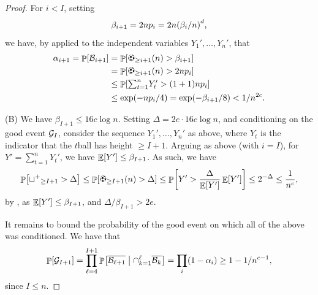 \begin{proof}
    For
    $i < I$, setting
    \begin{equation*}
        \beta_{i+1} = 2np_i  = 2 n \pth{\beta_i/n}^d,        
    \end{equation*}
    we have, by 
    applied to the independent variables $Y_1', \ldots, Y_n'$, that
    \begin{align*}
      \alpha_{i+1}%
      =%
      \Prob{\BadEvent_{i+1}}%
      &=%
      \Prob{\ballsY{i+1}{n} > \beta_{i+1}}%
      \\&
      =%
      \Prob{\ballsY{i+1}{n} > 2np_i}
      \\&
      \leq 
      \Prob{ \textstyle{\sum_{t=1}^n} Y_t' > (1+1)n p_i}%
      \\&
      \leq%
      \exp( -n p_i/4 )
      =
      \exp(-\beta_{i+1}/8) < 1/n^{2c}.
    \end{align*}

    (B) We have $\beta_{I+1} \leq 16 c \log n$.  Setting
    $\Delta = 2e \cdot 16 c \log n$, and conditioning on the good event
    $\mathcal{G}_I$,%
    consider the sequence $Y_1', \ldots, Y_n'$ as above, where $Y_t$ is the
    indicator that the $t$\th ball has height $\geq I+1$. Arguing as above
    (with $i = I$), for $Y' = \sum_{t=1}^n Y_t'$, we have
    $\mathop{\mathbb{E}}\!\left[ {Y'} \right] \leq \beta_{I+1}$. As such, we have
    \begin{equation*}
        \Prob{\BLX{I+1} > \Delta}
        \leq%
        \Prob{\ballsY{I+1}{n} > \Delta}%
        \leq%
        \Prob{Y' > \frac{\Delta}{\Ex{Y'}} \Ex{Y'} }           
        \leq%
        2^{ - \Delta}
        \leq%
        \frac{1}{n^c},        
    \end{equation*}
    by , as $\mathop{\mathbb{E}}\!\left[ { Y' } \right] \leq \beta_{I+1}$,
    and $\Delta/\beta_{I+1} > 2e$.
    

    It remains to bound the probability of the good event on which all of
    the above was conditioned. We have that
    \begin{equation*}
        \Prob{\GoodEvent_{I+1}}%
        =%
        \prod_{\ell=4}^{I+1} \ProbCond{\overline{\BadEvent_{\ell+1}}}{
           {\cap_{k=1}^\ell\overline{\BadEvent_k}}}
        =%
        \prod_i
        (1-\alpha_i)
        \geq
        1-1/n^{c-1},        
    \end{equation*}
    since $I \leq n$.


\end{proof}
